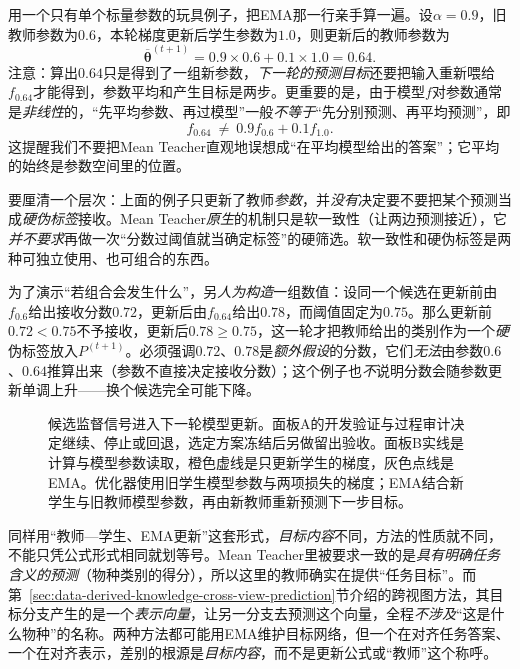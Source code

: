 用一个只有单个标量参数的玩具例子，把EMA那一行亲手算一遍。设$\alpha=0.9$，旧教师参数为$0.6$，本轮梯度更新后学生参数为$1.0$，则更新后的教师参数为
\[
  \overline{\bm{\theta}}^{(t+1)}=0.9\times0.6+0.1\times1.0=0.64.
\]
注意：算出$0.64$只是得到了一组新参数，\emph{下一轮的预测目标}还要把输入重新喂给$f_{0.64}$才能得到，参数平均和产生目标是两步。更重要的是，由于模型$f$对参数通常是\emph{非线性}的，“先平均参数、再过模型”一般\emph{不等于}“先分别预测、再平均预测”，即
\[
  f_{0.64}\ \neq\ 0.9f_{0.6}+0.1f_{1.0}.
\]
这提醒我们不要把Mean Teacher直观地误想成“在平均模型给出的答案”；它平均的始终是参数空间里的位置。

要厘清一个层次：上面的例子只更新了教师\emph{参数}，并\emph{没有}决定要不要把某个预测当成\emph{硬伪标签}接收。Mean Teacher\emph{原生}的机制只是软一致性（让两边预测接近），它\emph{并不要求}再做一次“分数过阈值就当确定标签”的硬筛选。软一致性和硬伪标签是两种可独立使用、也可组合的东西。

为了演示“若组合会发生什么”，另\emph{人为构造}一组数值：设同一个候选在更新前由$f_{0.6}$给出接收分数$0.72$，更新后由$f_{0.64}$给出$0.78$，而阈值固定为$0.75$。那么更新前$0.72<0.75$不予接收，更新后$0.78\geq0.75$，这一轮才把教师给出的类别作为一个\emph{硬}伪标签放入$P^{(t+1)}$。必须强调$0.72$、$0.78$是\emph{额外假设}的分数，它们\emph{无法}由参数$0.6$、$0.64$推算出来（参数不直接决定接收分数）；这个例子也\emph{不}说明分数会随参数更新单调上升——换个候选完全可能下降。

\begin{figure}[!t]
  \centering
  
  \caption{候选监督信号进入下一轮模型更新。面板A的开发验证与过程审计决定继续、停止或回退，选定方案冻结后另做留出验收。面板B实线是计算与模型参数读取，橙色虚线是只更新学生的梯度，灰色点线是EMA。优化器使用旧学生模型参数与两项损失的梯度；EMA结合新学生与旧教师模型参数，再由新教师重新预测下一步目标。}
  \label{fig:knowledge-acquisition-iterative-update}
\end{figure}

同样用“教师—学生、EMA更新”这套形式，\emph{目标内容}不同，方法的性质就不同，不能只凭公式形式相同就划等号。Mean Teacher里被要求一致的是\emph{具有明确任务含义的预测}（物种类别的得分），所以这里的教师确实在提供“任务目标”。而第~\ref{sec:data-derived-knowledge-cross-view-prediction}节介绍的跨视图方法，其目标分支产生的是一个\emph{表示向量}，让另一分支去预测这个向量，全程\emph{不涉及}“这是什么物种”的名称。两种方法都可能用EMA维护目标网络，但一个在对齐任务答案、一个在对齐表示，差别的根源是\emph{目标内容}，而不是更新公式或“教师”这个称呼。

